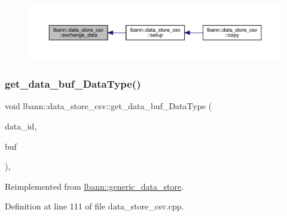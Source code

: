 \begin{figure}[H]
\begin{center}
\leavevmode
\includegraphics[width=350pt]{classlbann_1_1data__store__csv_acacd039d3ca8caf8958b731a1ce382c6_icgraph}
\end{center}
\end{figure}
\mbox{\label{classlbann_1_1data__store__csv_a3125cf637d40e8908c68bb74690f06da}} 
\subsubsection{\texorpdfstring{get\+\_\+data\+\_\+buf\+\_\+\+Data\+Type()}{get\_data\_buf\_DataType()}}
{\footnotesize\ttfamily void lbann\+::data\+\_\+store\+\_\+csv\+::get\+\_\+data\+\_\+buf\+\_\+\+Data\+Type (\begin{DoxyParamCaption}\item[{int}]{data\+\_\+id,  }\item[{std\+::vector$<$ Data\+Type $>$ $\ast$\&}]{buf }\end{DoxyParamCaption})\hspace{0.3cm}{\ttfamily [override]}, {\ttfamily [virtual]}}



Reimplemented from \hyperlink{classlbann_1_1generic__data__store_ab3f8b7fe6d6631059d92714d4277a983}{lbann\+::generic\+\_\+data\+\_\+store}.



Definition at line 111 of file data\+\_\+store\+\_\+csv.\+cpp.


